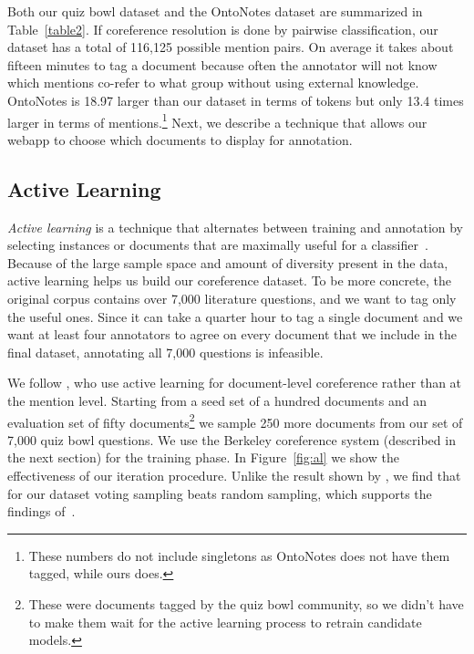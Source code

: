 Both our quiz bowl dataset and the OntoNotes dataset are summarized in
Table~\ref{table2}. If coreference resolution is done by pairwise
classification, our dataset has a total of 116,125 possible mention pairs. On
average it takes about fifteen minutes to tag a document because often the
annotator will not know which mentions co-refer to what group without using
external knowledge. OntoNotes is 18.97 larger than our dataset in terms of
tokens but only 13.4 times larger in terms of mentions.\footnote{These numbers
  do not include singletons as OntoNotes does not have them tagged, while ours
  does.} Next, we describe a technique that
allows our webapp to choose which documents to display for annotation.

\subsection{Active Learning}
\label{sec:al}




\emph{Active learning} is a technique that alternates between training and
annotation by selecting instances or documents that are maximally useful for a
classifier~\cite{settles2010active}. Because of the large sample space and amount of diversity
present in the data, active learning helps us build our coreference dataset. To be more concrete, the original corpus contains over
7,000 literature questions, and we want to tag only the useful ones. Since it can take a quarter hour to tag a single document and we want
at least four annotators to agree on every document that we include in the final dataset, annotating all 7,000 questions
is infeasible.

We follow , who use active learning for document-level
coreference rather than at the mention level. Starting from a seed set of a
hundred documents and an evaluation set of fifty documents\footnote{These were
  documents tagged by the quiz bowl community, so we didn't have to make them
  wait for the active learning process to retrain candidate models.} we sample
250 more documents from our set of 7,000 quiz bowl questions. We use the
Berkeley coreference system (described in the next section) for the training
phase. In Figure~\ref{fig:al} we show the effectiveness of our iteration
procedure. Unlike the result shown by , we find that
for our dataset voting sampling beats random sampling, which supports the
findings of~.


